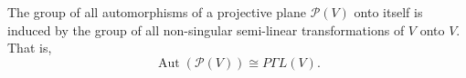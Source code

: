 The group of all automorphisms of a projective plane $\mathcal{P}(V)$ onto itself is induced by the group of all non-singular semi-linear transformations of $V$ onto $V$. That is,
$$\operatorname{Aut}(\mathcal{P}(V)) \cong P\Gamma L(V).$$
